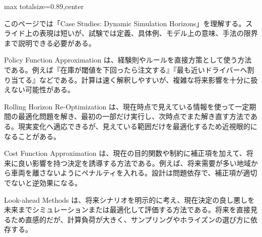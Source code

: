 \begin{minipage}[t]{0.58\textwidth}
\begin{adjustbox}{max totalsize={\textwidth}{0.89\textheight},center}
\begin{minipage}{\textwidth}\scriptsize
{}このページでは「Case Studies: Dynamic Simulation Horizons」を理解する。スライド上の表現は短いが、試験では定義、具体例、モデル上の意味、手法の限界まで説明できる必要がある。\par
Policy Function Approximation は、経験則やルールを直接方策として使う方法である。例えば『在庫が閾値を下回ったら注文する』『最も近いドライバーへ割り当てる』などである。計算は速く解釈しやすいが、複雑な将来影響を十分に扱えない可能性がある。\par
Rolling Horizon Re-Optimization は、現在時点で見えている情報を使って一定期間の最適化問題を解き、最初の一部だけ実行し、次時点でまた解き直す方法である。現実変化へ適応できるが、見えている範囲だけを最適化するため近視眼的になることがある。\par
Cost Function Approximation は、現在の目的関数や制約に補正項を加えて、将来に良い影響を持つ決定を誘導する方法である。例えば、将来需要が多い地域から車両を離さないようにペナルティを入れる。設計は問題依存で、補正項が適切でないと逆効果になる。\par
Look-ahead Methods は、将来シナリオを明示的に考え、現在決定の良し悪しを未来までシミュレーションまたは最適化して評価する方法である。将来を直接見るため直感的だが、計算負荷が大きく、サンプリングやホライズンの選び方に依存する。\par

\end{minipage}
\end{adjustbox}
\end{minipage}
